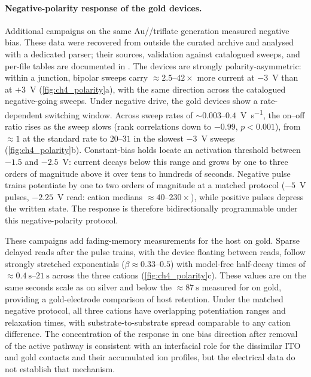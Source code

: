 \documentclass[12pt, twoside]{report}
\begin{document}
\paragraph{Negative-polarity response of the gold devices.} Additional campaigns on the same Au/\TMPE{}/triflate generation measured negative bias. These data were recovered from outside the curated archive and analysed with a dedicated parser; their sources, validation against catalogued sweeps, and per-file tables are documented in . The devices are strongly polarity-asymmetric: within a junction, bipolar sweeps carry \(\approx2.5\)--\(42\times\) more current at \(-3\)~\si{\volt} than at \(+3\)~\si{\volt} (\cref{fig:ch4_polarity}a), with the same direction across the catalogued negative-going sweeps. Under negative drive, the gold devices show a rate-dependent switching window. Across sweep rates of \(\sim\!0.003\)--\(0.4\)~\si{\volt\per\second}, the on--off ratio rises as the sweep slows (rank correlations down to \(-0.99\), \(p<0.001\)), from \(\approx\!1\) at the standard rate to \(\numrange{20}{31}\) in the slowest \(-3\)~\si{\volt} sweeps (\cref{fig:ch4_polarity}b). Constant-bias holds locate an activation threshold between \(-1.5\) and \(-2.5\)~\si{\volt}: current decays below this range and grows by one to three orders of magnitude above it over tens to hundreds of seconds. Negative pulse trains potentiate by one to two orders of magnitude at a matched protocol (\(-5\)~\si{\volt} pulses, \(-2.25\)~\si{\volt} read: cation medians \(\approx40\)--\(230\times\)), while positive pulses depress the written state. The response is therefore bidirectionally programmable under this negative-polarity protocol.

These campaigns add fading-memory measurements for the \TMPE{} host on gold. Sparse delayed reads after the pulse trains, with the device floating between reads, follow strongly stretched exponentials (\(\beta\approx0.33\)--\(0.5\)) with model-free half-decay times of \(\approx\SIrange{0.4}{21}{\second}\) across the three cations (\cref{fig:ch4_polarity}c). These values are on the same seconds scale as \TMPE{} on silver and below the \(\approx\SI{87}{\second}\) measured for \PEO{} on gold, providing a gold-electrode comparison of host retention. Under the matched negative protocol, all three cations have overlapping potentiation ranges and relaxation times, with substrate-to-substrate spread comparable to any cation difference. The concentration of the response in one bias direction after removal of the active  pathway is consistent with an interfacial role for the dissimilar ITO and gold contacts and their accumulated ion profiles, but the electrical data do not establish that mechanism.
\end{document}
